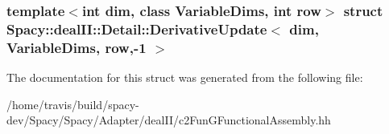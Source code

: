 \subsubsection*{template$<$int dim, class Variable\-Dims, int row$>$ struct Spacy\-::deal\-I\-I\-::\-Detail\-::\-Derivative\-Update$<$ dim, Variable\-Dims, row,-\/1 $>$}



\-The documentation for this struct was generated from the following file\-:\begin{DoxyCompactItemize}
\item 
/home/travis/build/spacy-\/dev/\-Spacy/\-Spacy/\-Adapter/deal\-I\-I/c2\-Fun\-G\-Functional\-Assembly.\-hh\end{DoxyCompactItemize}

